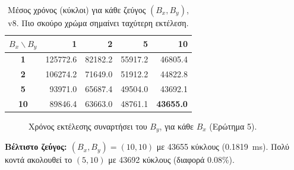 \documentclass[11pt,a4paper]{article}
\begin{document}
\begin{table}[H]
\centering
\caption{Μέσος χρόνος (κύκλοι) για κάθε ζεύγος $(B_x,B_y)$, v8. Πιο σκούρο χρώμα σημαίνει ταχύτερη εκτέλεση.}
\label{tab:dse_bxby}
\begin{tabular}{@{}c|rrrr@{}}
\toprule
$B_x \backslash B_y$ & \textbf{1} & \textbf{2} & \textbf{5} & \textbf{10} \\
\midrule
\textbf{1}  & \num{125772.6} & \cellcolor{accent!5}\num{82182.2}  & \cellcolor{accent!25}\num{55917.2} & \cellcolor{accent!40}\num{46805.4} \\
\textbf{2}  & \num{106274.2} & \cellcolor{accent!10}\num{71649.0} & \cellcolor{accent!30}\num{51912.2} & \cellcolor{accent!45}\num{44822.8} \\
\textbf{5}  & \cellcolor{accent!2}\num{93971.0}  & \cellcolor{accent!15}\num{65687.4} & \cellcolor{accent!35}\num{49504.0} & \cellcolor{accent!50}\num{43692.1} \\
\textbf{10} & \cellcolor{accent!3}\num{89846.4}  & \cellcolor{accent!18}\num{63663.0} & \cellcolor{accent!38}\num{48761.1} & \cellcolor{accent!60}\textbf{\num{43655.0}} \\
\bottomrule
\end{tabular}
\end{table}

\begin{figure}[H]
\centering
{}
\caption{Χρόνος εκτέλεσης συναρτήσει του $B_y$, για κάθε $B_x$ (Ερώτημα 5).}
\label{fig:dse_bxby}
\end{figure}

\noindent\textbf{Βέλτιστο ζεύγος: $(B_x,B_y)=(10,10)$} με \num{43655} κύκλους (\SI{0.1819}{ms}). Πολύ
κοντά ακολουθεί το $(5,10)$ με \num{43692} κύκλους (διαφορά 0.08\%).
\end{document}
